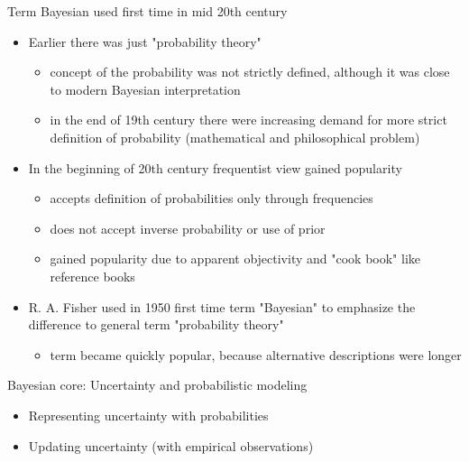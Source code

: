 \documentclass[10pt]{beamer}
\begin{document}
\begin{frame}{Term Bayesian used first time in mid 20th century}

  \begin{itemize}
  \item Earlier there was just "probability theory"
    \begin{itemize}
    \item concept of the probability was not strictly defined,
      although it was close to modern Bayesian interpretation
    \item in the end of 19th century there were increasing demand
      for more strict definition of probability (mathematical and
      philosophical problem)
    \end{itemize}
    \pause
    \item In the beginning of 20th century frequentist view gained popularity
    \begin{itemize}
    \item accepts definition of probabilities only through frequencies
    \item does not accept inverse probability or use of prior
    \item gained popularity due to apparent objectivity and "cook
      book" like reference books
    \end{itemize}
    \pause
    \item R. A. Fisher used in 1950 first
      time term "Bayesian" to emphasize the difference to general
      term "probability theory"
      \begin{itemize}
      \item term became quickly popular, because alternative
        descriptions were longer
    \end{itemize}
\end{itemize}
\end{frame}

\begin{frame}{Bayesian core: Uncertainty and probabilistic modeling}

  \begin{itemize}
  \item Representing uncertainty with probabilities
    \vspace{\baselineskip}
  \item Updating uncertainty (with empirical observations)
   \end{itemize}
\end{frame}
\end{document}
